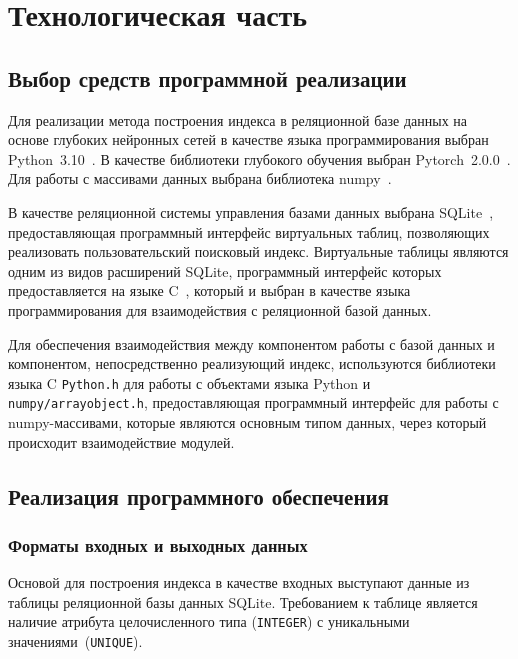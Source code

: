\chapter{\label{impl}Технологическая часть}

\section{Выбор средств программной реализации}

Для реализации метода построения индекса в реляционной базе данных на основе
глубоких нейронных сетей в качестве языка программирования выбран
Python~3.10~\cite{python}. В качестве библиотеки глубокого обучения выбран
Pytorch~2.0.0~\cite{pytorch}.  Для работы с массивами данных выбрана библиотека
numpy~\cite{numpy}.

В качестве реляционной системы управления базами данных выбрана
SQLite~\cite{sqlite}, предоставляющая программный интерфейс виртуальных таблиц,
позволяющих реализовать пользовательский поисковый индекс. Виртуальные таблицы
являются одним из видов расширений SQLite, программный интерфейс которых
предоставляется на языке C~\cite{c}, который и выбран в качестве языка
программирования для взаимодействия с реляционной базой данных.

Для обеспечения взаимодействия между компонентом работы с базой данных и
компонентом, непосредственно реализующий индекс, используются библиотеки языка C
\texttt{Python.h} для работы с объектами языка Python и
\texttt{numpy/arrayobject.h}, предоставляющая программный интерфейс для работы с
numpy-массивами, которые являются основным типом данных, через который
происходит взаимодействие модулей.

\section{Реализация программного обеспечения}

\subsection{Форматы входных и выходных данных}

Основой для построения индекса в качестве входных выступают данные из таблицы
реляционной базы данных SQLite. Требованием к таблице является наличие атрибута
целочисленного типа (\texttt{INTEGER}) с уникальными
значениями~(\texttt{UNIQUE}).

